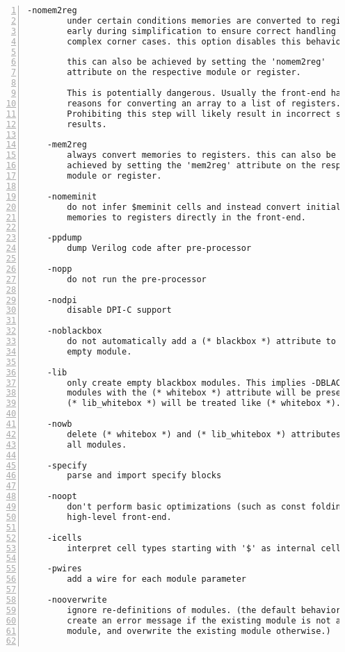 \begin{lstlisting}[numbers=left,frame=single]
    -nomem2reg
        under certain conditions memories are converted to registers
        early during simplification to ensure correct handling of
        complex corner cases. this option disables this behavior.

        this can also be achieved by setting the 'nomem2reg'
        attribute on the respective module or register.

        This is potentially dangerous. Usually the front-end has good
        reasons for converting an array to a list of registers.
        Prohibiting this step will likely result in incorrect synthesis
        results.

    -mem2reg
        always convert memories to registers. this can also be
        achieved by setting the 'mem2reg' attribute on the respective
        module or register.

    -nomeminit
        do not infer $meminit cells and instead convert initialized
        memories to registers directly in the front-end.

    -ppdump
        dump Verilog code after pre-processor

    -nopp
        do not run the pre-processor

    -nodpi
        disable DPI-C support

    -noblackbox
        do not automatically add a (* blackbox *) attribute to an
        empty module.

    -lib
        only create empty blackbox modules. This implies -DBLACKBOX.
        modules with the (* whitebox *) attribute will be preserved.
        (* lib_whitebox *) will be treated like (* whitebox *).

    -nowb
        delete (* whitebox *) and (* lib_whitebox *) attributes from
        all modules.

    -specify
        parse and import specify blocks

    -noopt
        don't perform basic optimizations (such as const folding) in the
        high-level front-end.

    -icells
        interpret cell types starting with '$' as internal cell types

    -pwires
        add a wire for each module parameter

    -nooverwrite
        ignore re-definitions of modules. (the default behavior is to
        create an error message if the existing module is not a black box
        module, and overwrite the existing module otherwise.)


\end{lstlisting}
